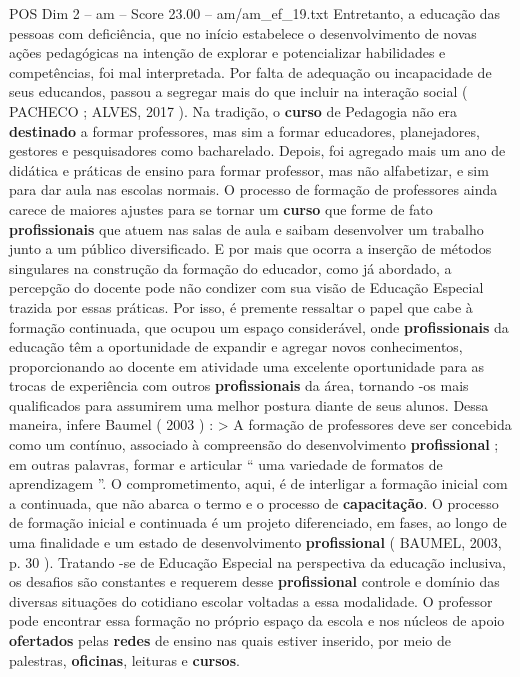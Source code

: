\begin{textsample}{POS Dim 2 – am – Score 23.00 – am/am\_ef\_19.txt}
Entretanto, a educação das pessoas com deficiência, que no início estabelece o desenvolvimento de novas ações pedagógicas na intenção de explorar e potencializar habilidades e competências, foi mal interpretada.
Por falta de adequação ou incapacidade de seus educandos, passou a segregar mais do que incluir na interação social ( PACHECO ; ALVES, 2017 ).
Na tradição, o \textbf{curso} de Pedagogia não era \textbf{destinado} a formar professores, mas sim a formar educadores, planejadores, gestores e pesquisadores como bacharelado.
Depois, foi agregado mais um ano de didática e práticas de ensino para formar professor, mas não alfabetizar, e sim para dar aula nas escolas normais.
O processo de formação de professores ainda carece de maiores ajustes para se tornar um \textbf{curso} que forme de fato \textbf{profissionais} que atuem nas salas de aula e saibam desenvolver um trabalho junto a um público diversificado.
E por mais que ocorra a inserção de métodos singulares na construção da formação do educador, como já abordado, a percepção do docente pode não condizer com sua visão de Educação Especial trazida por essas práticas.
Por isso, é premente ressaltar o papel que cabe à formação continuada, que ocupou um espaço considerável, onde \textbf{profissionais} da educação têm a oportunidade de expandir e agregar novos conhecimentos, proporcionando ao docente em atividade uma excelente oportunidade para as trocas de experiência com outros \textbf{profissionais} da área, tornando -os mais qualificados para assumirem uma melhor postura diante de seus alunos.
Dessa maneira, infere Baumel ( 2003 ) : > A formação de professores deve ser concebida como um contínuo, associado à compreensão do desenvolvimento \textbf{profissional} ; em outras palavras, formar e articular “ uma variedade de formatos de aprendizagem ”.
O comprometimento, aqui, é de interligar a formação inicial com a continuada, que não abarca o termo e o processo de \textbf{capacitação}.
O processo de formação inicial e continuada é um projeto diferenciado, em fases, ao longo de uma finalidade e um estado de desenvolvimento \textbf{profissional} ( BAUMEL, 2003, p. 30 ).
Tratando -se de Educação Especial na perspectiva da educação inclusiva, os desafios são constantes e requerem desse \textbf{profissional} controle e domínio das diversas situações do cotidiano escolar voltadas a essa modalidade.
O professor pode encontrar essa formação no próprio espaço da escola e nos núcleos de apoio \textbf{ofertados} pelas \textbf{redes} de ensino nas quais estiver inserido, por meio de palestras, \textbf{oficinas}, leituras e \textbf{cursos}.

\end{textsample}

